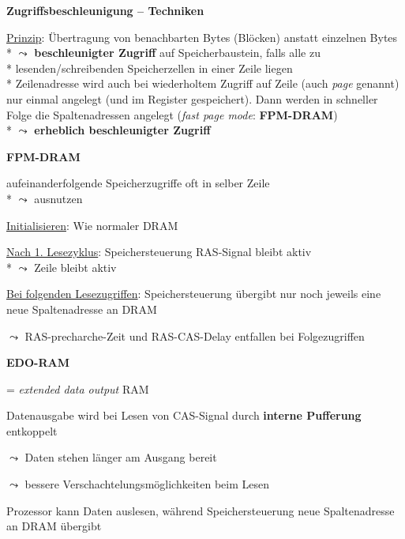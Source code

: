 \textbf{Zugriffsbeschleunigung -- Techniken}
\begin{items}
	\item \underline{Prinzip}: Übertragung von benachbarten Bytes (Blöcken) anstatt einzelnen Bytes \\*
		\( \leadsto \) \textbf{beschleunigter Zugriff} auf Speicherbaustein, falls alle zu \\* \phantom{\( \leadsto \)} lesenden/schreibenden Speicherzellen in einer Zeile liegen \\*
		Zeilenadresse wird auch bei wiederholtem Zugriff auf Zeile (auch \emph{page} genannt) nur einmal angelegt (und im Register gespeichert). Dann werden in schneller Folge die Spaltenadressen angelegt (\emph{fast page mode}: \textbf{FPM-DRAM}) \\*
		\( \leadsto \) \textbf{erheblich beschleunigter Zugriff}
\end{items}

\textbf{FPM-DRAM}
\begin{items}
	\item aufeinanderfolgende Speicherzugriffe oft in selber Zeile \\*
		 \( \leadsto \) ausnutzen
	\item \underline{Initialisieren}: Wie normaler DRAM
	\item \underline{Nach 1. Lesezyklus}: Speichersteuerung RAS-Signal bleibt aktiv \\*
		\( \leadsto \) Zeile bleibt aktiv
	\item \underline{Bei folgenden Lesezugriffen}: Speichersteuerung übergibt nur noch jeweils eine neue Spaltenadresse an DRAM
	\item \( \leadsto \) RAS-precharche-Zeit und RAS-CAS-Delay entfallen bei Folgezugriffen
\end{items}

\textbf{EDO-RAM}
\begin{items}
	\item = \emph{extended data output} RAM
	\item Datenausgabe wird bei Lesen von CAS-Signal durch \textbf{interne Pufferung} entkoppelt
	\item \( \leadsto \) Daten stehen länger am Ausgang bereit
	\item \( \leadsto \) bessere Verschachtelungsmöglichkeiten beim Lesen
	\item Prozessor kann Daten auslesen, während Speichersteuerung neue Spaltenadresse an DRAM übergibt
\end{items}

